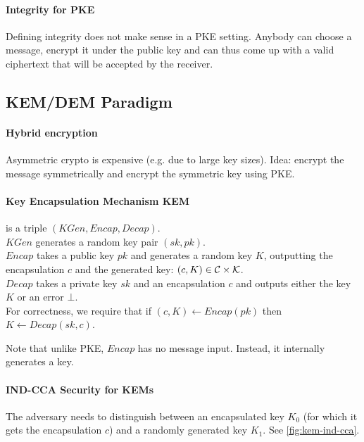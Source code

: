 \paragraph{Integrity for PKE}
Defining integrity does not make sense in a PKE setting.
Anybody can choose a message, encrypt it under the public key and can thus come
up with a valid ciphertext that will be accepted by the receiver.


\subsection{KEM/DEM Paradigm}

\paragraph{Hybrid encryption}
Asymmetric crypto is expensive (e.g. due to large key sizes).
Idea: encrypt the message symmetrically and encrypt the symmetric key using PKE.

\paragraph{Key Encapsulation Mechanism KEM}
is a triple $(KGen, Encap, Decap)$.
\\
$KGen$ generates a random key pair $(sk, pk)$. \\
$Encap$ takes a public key $pk$ and generates a random key $K$, outputting the encapsulation $c$ and the generated key: $(c, K) \in \mathcal{C} \times \mathcal{K}$. \\
$Decap$ takes a private key $sk$ and an encapsulation $c$ and outputs either the key $K$ or an error $\bot$.
\\
For correctness, we require that if $(c, K) \leftarrow Encap(pk)$ then $K \leftarrow Decap(sk, c)$.

Note that unlike PKE, $Encap$ has no message input.
Instead, it internally generates a key.

\paragraph{IND-CCA Security for KEMs}
The adversary needs to distinguish between an encapsulated key $K_0$
(for which it gets the encapsulation $c$) and a randomly generated key $K_1$.
See \autoref{fig:kem-ind-cca}.

